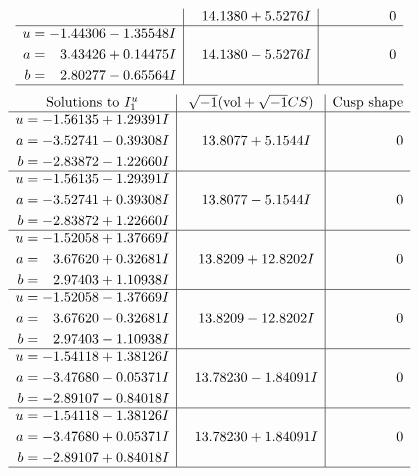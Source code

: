 \documentclass[1p]{elsarticle_modified}
\theoremstyle{definition}
\newcommand{\I}{\sqrt{-1}}
\begin{document}
$$\begin{array}{c|c|c}
 & \phantom{-}14.1380 + 5.5276 I & \phantom{-0.000000 } 0 \\ \hline\begin{aligned}
u &= -1.44306 - 1.35548 I \\
a &= \phantom{-}3.43426 + 0.14475 I \\
b &= \phantom{-}2.80277 - 0.65564 I\end{aligned}
 & \phantom{-}14.1380 - 5.5276 I & \phantom{-0.000000 } 0\\
 \hline 
 \end{array}$$\newpage$$\begin{array}{c|c|c}  
\text{Solutions to }I^u_{1}& \I (\text{vol} + \sqrt{-1}CS) & \text{Cusp shape}\\
 \hline 
\begin{aligned}
u &= -1.56135 + 1.29391 I \\
a &= -3.52741 - 0.39308 I \\
b &= -2.83872 - 1.22660 I\end{aligned}
 & \phantom{-}13.8077 + 5.1544 I & \phantom{-0.000000 } 0 \\ \hline\begin{aligned}
u &= -1.56135 - 1.29391 I \\
a &= -3.52741 + 0.39308 I \\
b &= -2.83872 + 1.22660 I\end{aligned}
 & \phantom{-}13.8077 - 5.1544 I & \phantom{-0.000000 } 0 \\ \hline\begin{aligned}
u &= -1.52058 + 1.37669 I \\
a &= \phantom{-}3.67620 + 0.32681 I \\
b &= \phantom{-}2.97403 + 1.10938 I\end{aligned}
 & \phantom{-}13.8209 + 12.8202 I & \phantom{-0.000000 } 0 \\ \hline\begin{aligned}
u &= -1.52058 - 1.37669 I \\
a &= \phantom{-}3.67620 - 0.32681 I \\
b &= \phantom{-}2.97403 - 1.10938 I\end{aligned}
 & \phantom{-}13.8209 - 12.8202 I & \phantom{-0.000000 } 0 \\ \hline\begin{aligned}
u &= -1.54118 + 1.38126 I \\
a &= -3.47680 - 0.05371 I \\
b &= -2.89107 - 0.84018 I\end{aligned}
 & \phantom{-}13.78230 - 1.84091 I & \phantom{-0.000000 } 0 \\ \hline\begin{aligned}
u &= -1.54118 - 1.38126 I \\
a &= -3.47680 + 0.05371 I \\
b &= -2.89107 + 0.84018 I\end{aligned}
 & \phantom{-}13.78230 + 1.84091 I & \phantom{-0.000000 } 0\\
 \hline 
 \end{array}$$\newpage\newpage\renewcommand{\arraystretch}{1}
\end{document}
